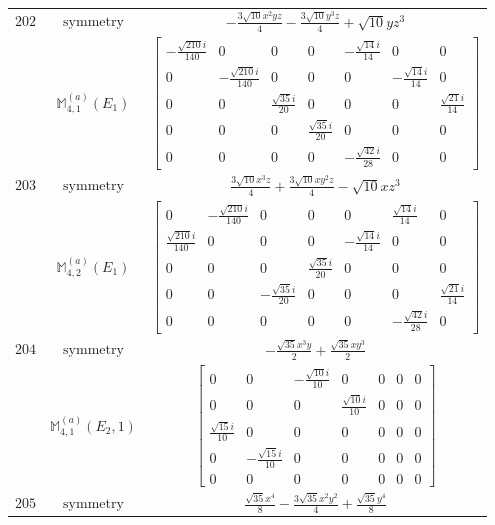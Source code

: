 \documentclass[fleqn,8pt,landscape]{jsarticle}
\begin{document}
\begin{longtable}{ccc}
$ 202 $ & $ \text{symmetry} $ & $ - \frac{3 \sqrt{10} x^{2} y z}{4} - \frac{3 \sqrt{10} y^{3} z}{4} + \sqrt{10} y z^{3} $ \\
$  $ & $ \mathbb{M}_{4,1}^{(a)}(E_{1}) $ & $ \begin{bmatrix} - \frac{\sqrt{210} i}{140} & 0 & 0 & 0 & - \frac{\sqrt{14} i}{14} & 0 & 0 \\ 0 & - \frac{\sqrt{210} i}{140} & 0 & 0 & 0 & - \frac{\sqrt{14} i}{14} & 0 \\ 0 & 0 & \frac{\sqrt{35} i}{20} & 0 & 0 & 0 & \frac{\sqrt{21} i}{14} \\ 0 & 0 & 0 & \frac{\sqrt{35} i}{20} & 0 & 0 & 0 \\ 0 & 0 & 0 & 0 & - \frac{\sqrt{42} i}{28} & 0 & 0 \end{bmatrix} $ \\ \hline
$ 203 $ & $ \text{symmetry} $ & $ \frac{3 \sqrt{10} x^{3} z}{4} + \frac{3 \sqrt{10} x y^{2} z}{4} - \sqrt{10} x z^{3} $ \\
$  $ & $ \mathbb{M}_{4,2}^{(a)}(E_{1}) $ & $ \begin{bmatrix} 0 & - \frac{\sqrt{210} i}{140} & 0 & 0 & 0 & \frac{\sqrt{14} i}{14} & 0 \\ \frac{\sqrt{210} i}{140} & 0 & 0 & 0 & - \frac{\sqrt{14} i}{14} & 0 & 0 \\ 0 & 0 & 0 & \frac{\sqrt{35} i}{20} & 0 & 0 & 0 \\ 0 & 0 & - \frac{\sqrt{35} i}{20} & 0 & 0 & 0 & \frac{\sqrt{21} i}{14} \\ 0 & 0 & 0 & 0 & 0 & - \frac{\sqrt{42} i}{28} & 0 \end{bmatrix} $ \\ \hline
$ 204 $ & $ \text{symmetry} $ & $ - \frac{\sqrt{35} x^{3} y}{2} + \frac{\sqrt{35} x y^{3}}{2} $ \\
$  $ & $ \mathbb{M}_{4,1}^{(a)}(E_{2},1) $ & $ \begin{bmatrix} 0 & 0 & - \frac{\sqrt{10} i}{10} & 0 & 0 & 0 & 0 \\ 0 & 0 & 0 & \frac{\sqrt{10} i}{10} & 0 & 0 & 0 \\ \frac{\sqrt{15} i}{10} & 0 & 0 & 0 & 0 & 0 & 0 \\ 0 & - \frac{\sqrt{15} i}{10} & 0 & 0 & 0 & 0 & 0 \\ 0 & 0 & 0 & 0 & 0 & 0 & 0 \end{bmatrix} $ \\ \hline
$ 205 $ & $ \text{symmetry} $ & $ \frac{\sqrt{35} x^{4}}{8} - \frac{3 \sqrt{35} x^{2} y^{2}}{4} + \frac{\sqrt{35} y^{4}}{8} $ \\

\end{longtable}
\end{document}
